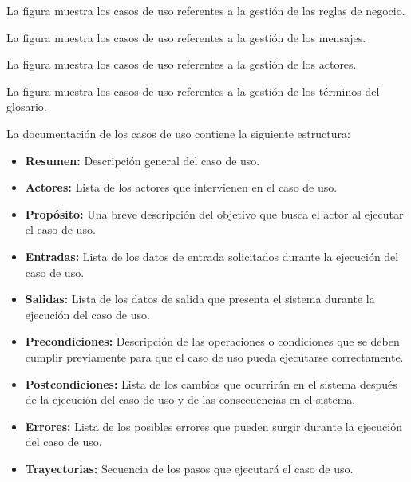 \clearpage
La figura  muestra los casos de uso referentes a la gestión de las reglas de negocio.\\


La figura  muestra los casos de uso referentes a la gestión de los mensajes.\\


\clearpage
La figura  muestra los casos de uso referentes a la gestión de los actores.\\


La figura  muestra los casos de uso referentes a la gestión de los términos del glosario.\\




\clearpage
La documentación de los casos de uso contiene la siguiente estructura:
 
    \begin{itemize}
	\item {\bf Resumen:} Descripción general del caso de uso.
	\item {\bf Actores:} Lista de los actores que intervienen en el caso de uso.
	\item {\bf Propósito:} Una breve descripción del objetivo que busca el actor al ejecutar el caso de uso.
	\item {\bf Entradas:} Lista de los datos de entrada solicitados durante la ejecución del caso de uso.
	\item {\bf Salidas:} Lista de los datos de salida que presenta el sistema durante la ejecución del caso de uso.
	\item {\bf Precondiciones:} Descripción de las operaciones o condiciones que se deben cumplir previamente para que el caso de uso pueda ejecutarse correctamente.
	\item {\bf Postcondiciones:} Lista de los cambios que ocurrirán en el sistema después de la ejecución del caso de uso y de las consecuencias en el sistema.
	\item {\bf Errores:} Lista de los posibles errores que pueden surgir durante la ejecución del caso de uso.
	\item {\bf Trayectorias:} Secuencia de los pasos que ejecutará el caso de uso.
    \end{itemize}
    
